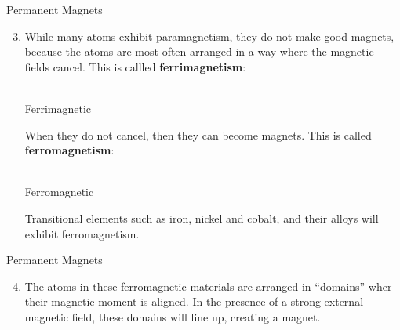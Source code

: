\documentclass[12pt,aspectratio=169]{beamer}
\begin{document}
\begin{frame}{Permanent Magnets}
  \begin{enumerate}
    \setcounter{enumi}{2}
  \item While many atoms exhibit paramagnetism, they do not make good magnets,
    because the atoms are most often arranged in a way where the magnetic fields
    cancel. This is callled \textbf{ferrimagnetism}:
    \begin{center}
      \\
      Ferrimagnetic
    \end{center}
    When they do not cancel, then they can become magnets. This is called
    \textbf{ferromagnetism}:
    \begin{center}
      \\
      Ferromagnetic
    \end{center}
    Transitional elements such as iron, nickel and cobalt, and their alloys
    will exhibit ferromagnetism.
  \end{enumerate}
\end{frame}



\begin{frame}{Permanent Magnets}
  \begin{enumerate}
    \setcounter{enumi}{3}
  \item The atoms in these ferromagnetic materials are arranged in ``domains''
    wher their magnetic moment is aligned. In the presence of a strong
    external magnetic field, these domains will line up, creating a magnet.
    \begin{center}
    \end{center}
  \end{enumerate}
\end{frame}
\end{document}

